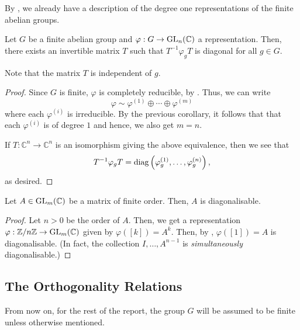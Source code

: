 \begin{rem}
	By , we already have a description of the degree one representations of the finite abelian groups.
\end{rem}

\begin{cor} \label{cor:finabelrepdiagonal}
	Let $G$ be a finite abelian group and $\varphi : G \to \operatorname{GL}_n(\mathbb{C})$ a representation. Then, there exists an invertible matrix $T$ such that $T^{-1}\varphi_gT$ is diagonal for all $g \in G.$
\end{cor}
Note that the matrix $T$ is independent of $g.$ 
\begin{proof} 
	Since $G$ is finite, $\varphi$ is completely reducible, by . Thus, we can write
	\begin{equation*} 
		\varphi \sim \varphi^{(1)} \oplus \cdots \oplus \varphi^{(m)}
	\end{equation*}
	where each $\varphi^{(i)}$ is irreducible. By the previous corollary, it follows that that each $\varphi^{(i)}$ is of degree $1$ and hence, we also get $m = n.$

	If $T : \mathbb{C}^n \to \mathbb{C}^n$ is an isomorphism giving the above equivalence, then we see that 
	\begin{equation*} 
		T^{-1}\varphi_gT = \operatorname{diag}\left(\varphi^{(1)}_g, \ldots, \varphi^{(n)}_g\right),
	\end{equation*}
	as desired.
\end{proof}

\begin{cor} \label{cor:finorderdiagonalisable}
	Let $A \in \operatorname{GL}_m(\mathbb{C})$ be a matrix of finite order. Then, $A$ is diagonalisable.
\end{cor}
\begin{proof}
	Let $n > 0$ be the order of $A.$ Then, we get a representation $\varphi:\mathbb{Z}/n\mathbb{Z} \to \operatorname{GL}_m(\mathbb{C})$ given by $\varphi\left([k]\right) = A^k.$ Then, by , $\varphi\left([1]\right) = A$ is diagonalisable. (In fact, the collection $I, \ldots, A^{n-1}$ is \emph{simultaneously} diagonalisable.)
\end{proof}

\subsection{The Orthogonality Relations}

\begin{disc}
	From now on, for the rest of the report, the group $G$ will be assumed to be finite unless otherwise mentioned.
\end{disc}

